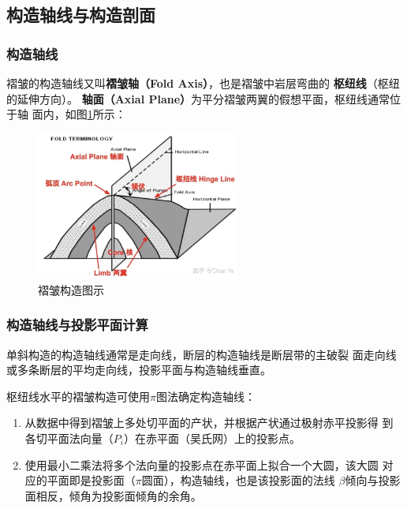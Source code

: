 \documentclass[a4paper,twoside]{ctexart}
\begin{document}
\subsection{构造轴线与构造剖面}

\subsubsection{构造轴线}

褶皱的构造轴线又叫\textbf{褶皱轴（Fold Axis）}，也是褶皱中岩层弯曲的
\textbf{枢纽线}（枢纽的延伸方向）。
\textbf{轴面（Axial Plane）}为平分褶皱两翼的假想平面，枢纽线通常位于轴
面内，如图\ref{fig:褶皱构造图示}所示：

\begin{figure}[htbp]
  \centering
    \includegraphics[width=0.6\textwidth]{pic/褶皱构造图示.png}
  \caption{褶皱构造图示}
  \label{fig:褶皱构造图示}
\end{figure}

\subsubsection{构造轴线与投影平面计算}
\label{sec:构造轴线与投影平面计算}
单斜构造的构造轴线通常是走向线，断层的构造轴线是断层带的主破裂
面走向线或多条断层的平均走向线，投影平面与构造轴线垂直。

枢纽线水平的褶皱构造可使用$\pi$图法确定构造轴线：
\begin{enumerate}
\item 从数据中得到褶皱上多处切平面的产状，并根据产状通过极射赤平投影得
  到各切平面法向量（$P_i$）在赤平面（吴氏网）上的投影点。 
\item 使用最小二乘法将多个法向量的投影点在赤平面上拟合一个大圆，该大圆
  对应的平面即是投影面（$\pi$圆面），构造轴线，也是该投影面的法线
  $\beta$倾向与投影面相反，倾角为投影面倾角的余角。
\end{enumerate}
\end{document}
